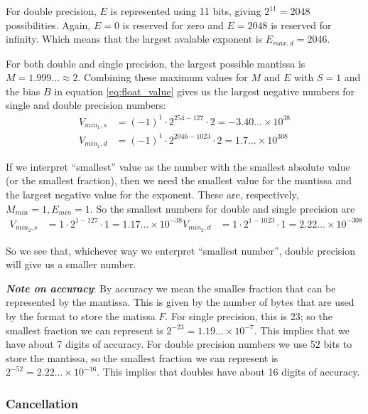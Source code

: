 For double precision, $E$ is represented using 11 bits, giving $2^{11}=2048$ possibilities. Again, $E=0$ is reserved for zero and $E=2048$ is reserved for infinity. Which means that the largest avalable exponent is $E_{max,d}=2046$.

For both double and single precision, the largest possible mantissa is $M=1.999\dots \approx 2$. Combining these maximum values for $M$ and $E$ with $S=1$ and the bias $B$ in equation \eqref{eq:float_value} gives us the largest negative numbers for single and double precision numbers:
\begin{align}
    V_{min_1, s} &= (-1)^1 \cdot 2^{254-127} \cdot 2 = -3.40\dots\times 10^{38} \\
    V_{min_1, d} &= (-1)^1 \cdot 2^{2046-1023} \cdot 2 = 1.7\dots \times 10^{308}
\end{align}

If we interpret ``smallest'' value as the number with the smallest absolute value (or the smallest fraction), then we need the smallest value for the mantissa and the largest negative value for the exponent. These are, respectively, $M_{min} = 1, E_{min} = 1$. So the smallest numbers for double and single precision are
\begin{align}
    V_{min_2, s} &= 1 \cdot 2^{1-127} \cdot 1 = 1.17\dots \times 10^{-38}
    V_{min_2, d} &= 1 \cdot 2^{1-1023} \cdot 1 = 2.22\dots \times 10^{-308}
\end{align}

So we see that, whichever way we enterpret ``smallest number'', double precision will give us a smaller number.

\vspace*{1em}\noindent \textbf{\emph{Note on accuracy}}: By accuracy we mean the smalles fraction that can be represented by the mantissa. This is given by the number of bytes that are used by the format to store the matissa $F$. For single precision, this is 23; so the smallest fraction we can represent is $2^{-23} = 1.19\dots \times 10^{-7}$. This implies that we have about 7 digits of accuracy. For double precision numbers we use 52 bits to store the mantissa, so the smallest fraction we can represent is $2^{-52}=2.22\dots \times 10^{-16}$. This implies that doubles have about 16 digits of accuracy.

\subsubsection{Cancellation} %
\label{ssub:cancellation}


